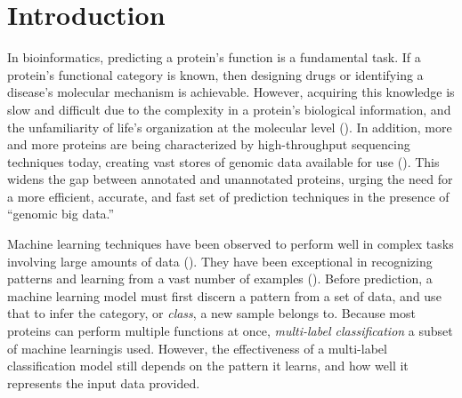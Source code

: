 %
%
%
%
%

\chapter{Introduction}
\label{Introduction}

\par In bioinformatics, predicting a protein's function is a fundamental task.
If a protein's functional category is known, then designing drugs or
identifying a disease's molecular mechanism is achievable. However, acquiring
this knowledge is slow and difficult due to the complexity in a protein's
biological information, and the unfamiliarity of life's organization at the
molecular level (\cite{baldi2001bioinformatics}). In addition, more and more
proteins are being characterized by high-throughput sequencing techniques
today, creating vast stores of genomic data available for use
(\cite{gaudet2017gene, cozzetto2017computational}). This widens the gap between
annotated and unannotated proteins, urging the need for a more efficient,
accurate, and fast set of prediction techniques in the presence of
``genomic big data.''

\par Machine learning techniques have been observed to perform well in complex
tasks involving large amounts of data (\cite{chen2014data}). They have been
exceptional in recognizing patterns and learning from a vast number of examples 
(\cite{lecun2015deep}). Before prediction, a machine learning model must first
discern a pattern from a set of data, and use that to infer the category, or 
\textit{class}, a new sample belongs to. Because most proteins can perform
multiple functions at once, \textit{multi-label classification}\textemdash
a subset of machine learning\textemdash is used. However, the effectiveness of
a multi-label classification model still depends on the pattern it learns, and
how well it represents the input data provided.

